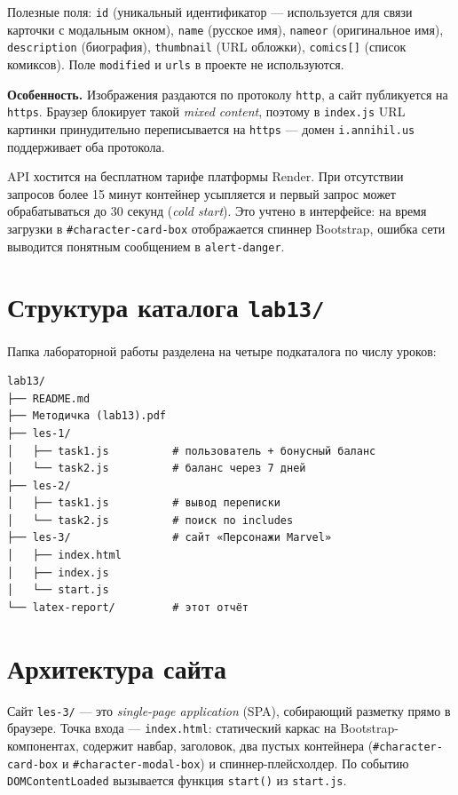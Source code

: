 Полезные поля: \texttt{id} (уникальный идентификатор --- используется
для связи карточки с модальным окном), \texttt{name} (русское имя),
\texttt{nameor} (оригинальное имя), \texttt{description} (биография),
\texttt{thumbnail} (URL обложки), \texttt{comics[]} (список комиксов).
Поле \texttt{modified} и \texttt{urls} в проекте не используются.

\textbf{Особенность.} Изображения раздаются по протоколу \texttt{http},
а сайт публикуется на \texttt{https}. Браузер блокирует такой
\textit{mixed content}, поэтому в \texttt{index.js} URL картинки
принудительно переписывается на \texttt{https} --- домен
\texttt{i.annihil.us} поддерживает оба протокола.

API хостится на бесплатном тарифе платформы Render. При отсутствии
запросов более 15 минут контейнер усыпляется и первый запрос может
обрабатываться до \(30\) секунд (\textit{cold start}). Это учтено в
интерфейсе: на время загрузки в \texttt{\#character-card-box} отображается
спиннер Bootstrap, ошибка сети выводится понятным сообщением в
\texttt{alert-danger}.

\section{Структура каталога \texttt{lab13/}}

Папка лабораторной работы разделена на четыре подкаталога по числу
уроков:

\begin{lstlisting}[caption={Файловая структура \texttt{lab13/}},captionpos=b]
lab13/
├── README.md
├── Методичка (lab13).pdf
├── les-1/
│   ├── task1.js          # пользователь + бонусный баланс
│   └── task2.js          # баланс через 7 дней
├── les-2/
│   ├── task1.js          # вывод переписки
│   └── task2.js          # поиск по includes
├── les-3/                # сайт «Персонажи Marvel»
│   ├── index.html
│   ├── index.js
│   └── start.js
└── latex-report/         # этот отчёт
\end{lstlisting}

\section{Архитектура сайта}

Сайт \texttt{les-3/} --- это \emph{single-page application} (SPA),
собирающий разметку прямо в браузере. Точка входа ---
\texttt{index.html}: статический каркас на Bootstrap-компонентах,
содержит навбар, заголовок, два пустых контейнера
(\texttt{\#character-card-box} и \texttt{\#character-modal-box}) и
спиннер-плейсхолдер. По событию \texttt{DOMContentLoaded}
вызывается функция \texttt{start()} из \texttt{start.js}.

